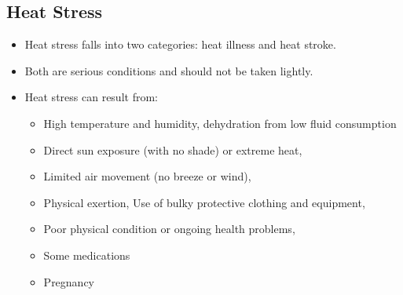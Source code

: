 \begin{itemize}
\subsection{Heat Stress}
\begin{itemize}
\item Heat stress falls into two categories: heat illness and heat stroke. 
\item Both are serious conditions and should not be taken lightly. 
\item Heat stress can result from: 
\begin{itemize}
\item High temperature and humidity, dehydration from low fluid consumption
\item Direct sun exposure (with no shade) or extreme heat, 
\item Limited air movement (no breeze or wind), 
\item Physical exertion, Use of bulky protective clothing and equipment, 
\item Poor physical condition or ongoing health problems, 
\item Some medications
\item Pregnancy
\end{itemize}
\end{itemize} 


\end{itemize}

